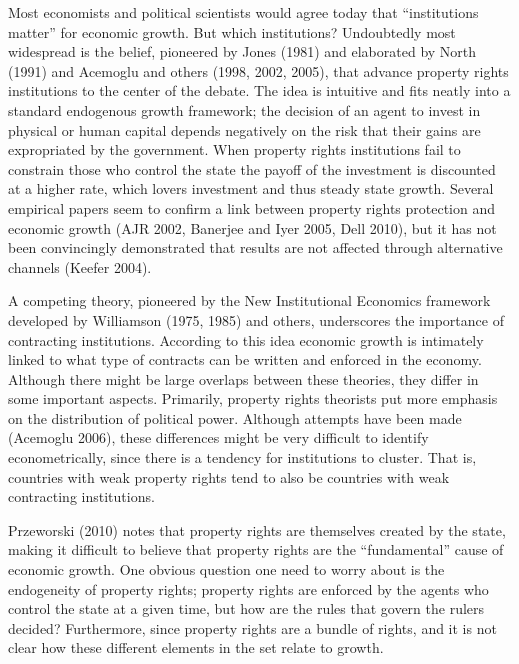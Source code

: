 \documentclass[12pt]{article}%
\begin{document}
Most economists and political scientists would agree today that ``institutions matter'' for economic growth. But which institutions? Undoubtedly most widespread is the belief, pioneered by Jones (1981) and elaborated by North (1991) and Acemoglu and others (1998, 2002, 2005), that advance property rights institutions to the center of the debate. The idea is intuitive and fits neatly into a standard endogenous growth framework; the decision of an agent to invest in physical or human capital depends negatively on the risk that their gains are expropriated by the government. When property rights institutions fail to constrain those who control the state the payoff of the investment is discounted at a higher rate, which lovers investment and thus steady state growth. Several empirical papers seem to confirm a link between property rights protection and economic growth (AJR 2002, Banerjee and Iyer 2005, Dell 2010), but it has not been convincingly demonstrated that results are not affected through alternative channels (Keefer 2004). 

A competing theory, pioneered by the New Institutional Economics framework developed by Williamson (1975, 1985) and others, underscores the importance of contracting institutions. According to this idea economic growth is intimately linked to what type of contracts can be written and enforced in the economy. Although there might be large overlaps between these theories, they differ in some important aspects. Primarily, property rights theorists put more emphasis on the distribution of political power. Although attempts have been made (Acemoglu 2006), these differences might be very difficult to identify econometrically, since there is a tendency for institutions to cluster. That is, countries with weak property rights tend to also be countries with weak contracting institutions. 

Przeworski (2010) notes that property rights are themselves created by the state, making it difficult to believe that property rights are the ``fundamental'' cause of economic growth. One obvious question one need to worry about is the endogeneity of property rights; property rights are enforced by the agents who control the state at a given time, but how are the rules that govern the rulers decided? Furthermore, since property rights are a bundle of rights, and it is not clear how these different elements in the set relate to growth.  \\
\end{document}
